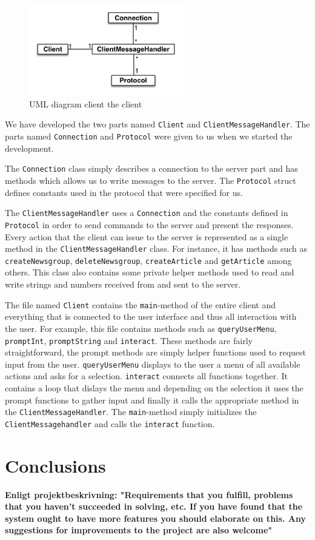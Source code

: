 \documentclass[a4paper]{article}
\begin{document}
\begin{figure}
    \centering
    \includegraphics[width=0.6\textwidth]{projectUML-client.png}
    \caption{UML diagram client the client}
    \label{clientUML}
\end{figure}

We have developed the two parts named \texttt{Client} and \texttt{ClientMessageHandler}. The parts named \texttt{Connection} and \texttt{Protocol} were given to us when we started the development.

The \texttt{Connection} class simply describes a connection to the server part and has methods which allows us to write messages to the server. The \texttt{Protocol} struct defines constants used in the protocol that were specified for us.

The \texttt{ClientMessageHandler} uses a \texttt{Connection} and the constants defined in \texttt{Protocol} in order to send commands to the server and present the responses. Every action that the client can issue to the server is represented as a single method in the \texttt{ClientMessageHandler} class. For instance, it has methods such as \texttt{createNewsgroup}, \texttt{deleteNewsgroup}, \texttt{createArticle} and \texttt{getArticle} among others. This class also contains some private helper methods used to read and write strings and numbers received from and sent to the server.

The file named \texttt{Client} contains the \texttt{main}-method of the entire client and everything that is connected to the user interface and thus all interaction with the user. For example, this file contains methods such as \texttt{queryUserMenu}, \texttt{promptInt}, \texttt{promptString} and \texttt{interact}. These methods are fairly straightforward, the prompt methods are simply helper functions used to request input from the user. \texttt{queryUserMenu} displays to the user a menu of all available actions and asks for a selection. \texttt{interact} connects all functions together. It contains a loop that dislays the menu and depending on the selection it uses the prompt functions to gather input and finally it calls the appropriate method in the \texttt{ClientMessageHandler}. The \texttt{main}-method simply initializes the \texttt{ClientMessagehandler} and calls the \texttt{interact} function.

\section{Conclusions}

\textbf{Enligt projektbeskrivning:
"Requirements that you fulfill, problems that you haven’t succeeded in solving,
etc. If you have found that the system ought to have more features you should elaborate on
this. Any suggestions for improvements to the project are also welcome"}
\end{document}
